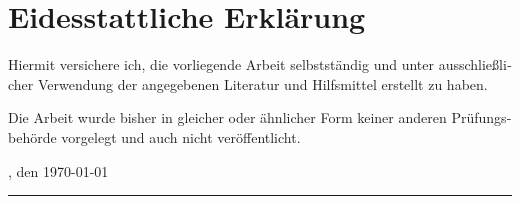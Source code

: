 
\newpage
\chapter*{Eidesstattliche Erklärung}
\setcounter{page}{2}

\begin{otherlanguage}{german}
Hiermit versichere ich, die vorliegende Arbeit selbstständig und unter ausschließlicher Verwendung der angegebenen Literatur und Hilfsmittel erstellt zu haben.

Die Arbeit wurde bisher in gleicher oder ähnlicher Form keiner anderen Prü\-fungs\-be\-hör\-de vorgelegt und auch nicht veröffentlicht.\\[1cm]

\begin{minipage}[t]{0.4\textwidth}
    \myPlace{}, den \today
\end{minipage}
\qquad\qquad
\begin{minipage}[t]{0.4\textwidth}
    \rule{\linewidth}{0.5mm}\\
    \myName{}
\end{minipage}
\end{otherlanguage}